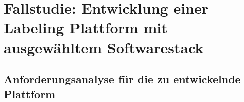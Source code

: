 \chapter{Fallstudie: Entwicklung einer Labeling Plattform mit ausgewähltem Softwarestack}\label{sec:anforderungsanalyse}
\section{Anforderungsanalyse für die zu entwickelnde Plattform}